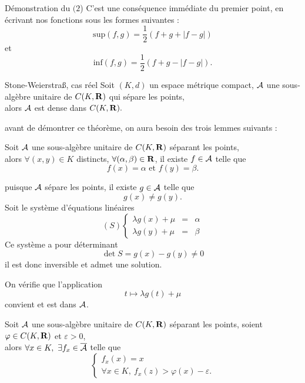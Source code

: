 \documentclass[a4paper,11pt, twoside]{article}
\begin{document}
\begin{ProofC}{Démonstration du $(\mathit2$)}
  C'est une conséquence immédiate du premier point, en écrivant nos fonctions sous les formes suivantes : 
  $$\mathrm{sup}(f,g)=\frac12\left(f+g+|f-g|\right)$$
  et
  $$\mathrm{inf}(f,g)=\frac12\left(f+g-|f-g|\right).$$
\end{ProofC}


\begin{thC}{Stone-Weierstra\ss, cas réel}
  Soit $(K,d)$ un espace métrique compact, $\mathcal A$ une sous-algèbre unitaire de $C(K,\mathbf R)$ qui sépare les points,\\

  alors $\mathcal A$ est dense dans $C(K,\mathbf R).$
\end{thC}


avant de démontrer ce théorème, on aura besoin des trois lemmes suivants :


\begin{lemme}
  Soit $\mathcal A$ une sous-algèbre unitaire de $C(K,\mathbf R)$ séparant les points,\\

  alors $\forall (x,y)\in K$ distincts, $\forall (\alpha,\beta)\in\mathbf R$, il existe $f\in\mathcal A$ telle que 
  $$f(x)=\alpha\text{ et }f(y)=\beta.$$
\end{lemme}


\begin{Proof}
  puisque $\mathcal A$ sépare les points, il existe $g\in\mathcal A$ telle que
  $$g(x)\neq g(y).$$
  Soit le système d'équations linéaires
  $$(S)\left\{\begin{array}{rcl}
    \lambda g(x)+\mu&=&\alpha\\
    \lambda g(y)+\mu&=&\beta
  \end{array}\right.$$
  Ce système a pour déterminant
  $$\det S=g(x)-g(y)\neq 0$$
  il est donc inversible et admet une solution.

  On vérifie que l'application 
  $$t\longmapsto \lambda g(t)+\mu$$
  convient et est dans $\mathcal A$.
\end{Proof}


\begin{lemme}
  Soit $\mathcal A$ une sous-algèbre unitaire de $C(K,\mathbf R)$ séparant les points, soient $\varphi\in C(K,\mathbf R)$ et $\varepsilon>0$,\\

  alors $\forall x\in K,\ \exists f_x\in\overline{\mathcal A}$ telle que 
  $$\left\{\begin{array}{l}
    f_x(x)=x\\
    \forall x\in K,\ f_x(z)>\varphi(x)-\varepsilon.
  \end{array}\right.$$
\end{lemme}
\end{document}
